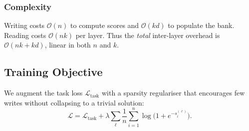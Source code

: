 \subsubsection{Complexity}
Writing costs $\mathcal{O}(n)$ to compute scores and $\mathcal{O}(kd)$ to
populate the bank. Reading costs $\mathcal{O}(nk)$ per layer. Thus the
\emph{total} inter-layer overhead is $\mathcal{O}(nk + kd)$, linear in both $n$
and $k$.

\subsection{Training Objective}

We augment the task loss $\mathcal{L}_{\text{task}}$ with a sparsity regulariser
that encourages few writes without collapsing to a trivial solution:
\begin{equation}
  \mathcal{L} = \mathcal{L}_{\text{task}} +
                \lambda \sum_\ell \frac{1}{n}\sum_{i=1}^n
                \log\bigl(1 + e^{-s_i^{(\ell)}}\bigr).
  \label{eq:loss}
\end{equation}

